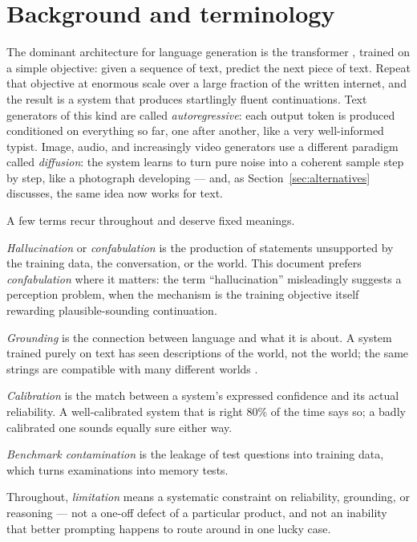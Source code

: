 \documentclass[11pt,a4paper]{article}
\begin{document}
\section{Background and terminology}
\label{sec:background}

The dominant architecture for language generation is the transformer
\autocite{vaswani2017attention}, trained on a simple objective: given a
sequence of text, predict the next piece of text. Repeat that objective at
enormous scale over a large fraction of the written internet, and the result
is a system that produces startlingly fluent continuations. Text generators
of this kind are called \emph{autoregressive}: each output token is produced
conditioned on everything so far, one after another, like a very well-informed
typist. Image, audio, and increasingly video generators use a different
paradigm called \emph{diffusion}: the system learns to turn pure noise into a
coherent sample step by step, like a photograph developing --- and, as
Section~\ref{sec:alternatives} discusses, the same idea now works for text.

A few terms recur throughout and deserve fixed meanings.

\emph{Hallucination} or \emph{confabulation} is the production of statements
unsupported by the training data, the conversation, or the world. This
document prefers \emph{confabulation} where it matters: the term
``hallucination'' misleadingly suggests a perception problem, when the
mechanism is the training objective itself rewarding plausible-sounding
continuation.

\emph{Grounding} is the connection between language and what it is about.
A system trained purely on text has seen descriptions of the world, not the
world; the same strings are compatible with many different worlds
\autocite{bender2020climbing}.

\emph{Calibration} is the match between a system's expressed confidence and
its actual reliability. A well-calibrated system that is right 80\% of the
time says so; a badly calibrated one sounds equally sure either way.

\emph{Benchmark contamination} is the leakage of test questions into training
data, which turns examinations into memory tests.

Throughout, \emph{limitation} means a systematic constraint on reliability,
grounding, or reasoning --- not a one-off defect of a particular product,
and not an inability that better prompting happens to route around in one
lucky case.
\end{document}
